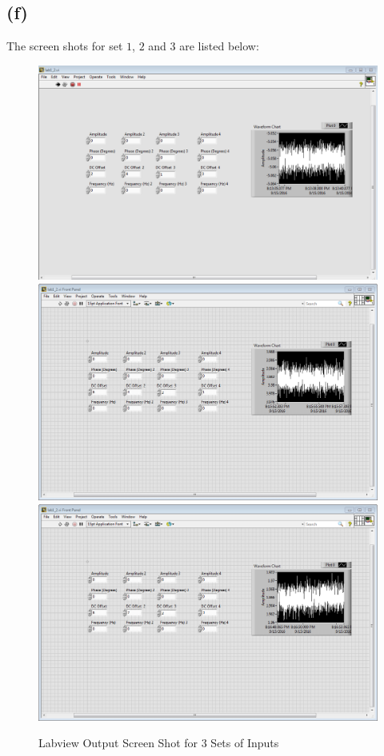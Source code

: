 \documentclass[letterpaper]{article}
\begin{document}
\subsection*{(f)}
The screen shots for set $1$, $2$ and $3$ are listed below:
\begin{figure}[H]
	\centering
	\includegraphics[scale=0.4]{f_set1.PNG}
	\includegraphics[scale=0.4]{f_set2.PNG}
	\includegraphics[scale=0.4]{f_set3.PNG}
	\caption{Labview Output Screen Shot for 3 Sets of Inputs}
	\label{fig:sc}
\end{figure}
\end{document}
